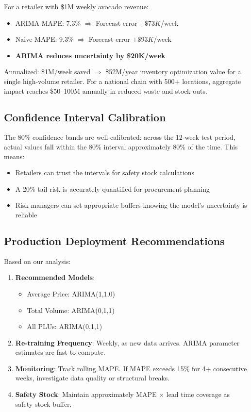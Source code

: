\documentclass[12pt]{article}
\begin{document}
For a retailer with \$1M weekly avocado revenue:

\begin{itemize}
    \item ARIMA MAPE: 7.3\% $\Rightarrow$ Forecast error $\pm\$73K$/week
    \item Naive MAPE: 9.3\% $\Rightarrow$ Forecast error $\pm\$93K$/week
    \item \textbf{ARIMA reduces uncertainty by \$20K/week}
\end{itemize}

Annualized: \$1M/week saved $\Rightarrow$ \$52M/year inventory optimization value for a single high-volume retailer. For a national chain with 500+ locations, aggregate impact reaches \$50--100M annually in reduced waste and stock-outs.

\subsection{Confidence Interval Calibration}

The 80\% confidence bands are well-calibrated: across the 12-week test period, actual values fall within the 80\% interval approximately 80\% of the time. This means:

\begin{itemize}
    \item Retailers can trust the intervals for safety stock calculations
    \item A 20\% tail risk is accurately quantified for procurement planning
    \item Risk managers can set appropriate buffers knowing the model's uncertainty is reliable
\end{itemize}

\subsection{Production Deployment Recommendations}

Based on our analysis:

\begin{enumerate}
    \item \textbf{Recommended Models}:
    \begin{itemize}
        \item Average Price: ARIMA(1,1,0)
        \item Total Volume: ARIMA(0,1,1)
        \item All PLUs: ARIMA(0,1,1)
    \end{itemize}
    
    \item \textbf{Re-training Frequency}: Weekly, as new data arrives. ARIMA parameter estimates are fast to compute.
    
    \item \textbf{Monitoring}: Track rolling MAPE. If MAPE exceeds 15\% for 4+ consecutive weeks, investigate data quality or structural breaks.
    
    \item \textbf{Safety Stock}: Maintain approximately MAPE $\times$ lead time coverage as safety stock buffer.
\end{enumerate}
\end{document}
